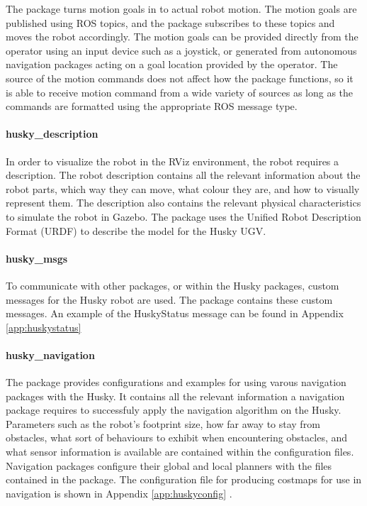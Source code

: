 The package  turns motion goals in to actual robot motion. The motion goals are published using ROS topics, and the  package subscribes to these topics and moves the robot accordingly. The motion goals can be provided directly from the operator using an input device such as a joystick, or generated from autonomous navigation packages acting on a goal location provided by the operator. The source of the motion commands does not affect how the package functions, so it is able to receive motion command from a wide variety of sources as long as the commands are formatted using the appropriate ROS message type.\\ 

\paragraph{husky\_description}

In order to visualize the robot in the RViz environment, the robot requires a description. The robot description contains all the relevant information about the robot parts, which way they can move, what colour they are, and how to visually represent them. The description also contains the relevant physical characteristics to simulate the robot in Gazebo. The  package uses the Unified Robot Description Format (URDF) to describe the model for the Husky UGV.\\

\paragraph{husky\_msgs}

To communicate with other packages, or within the Husky packages, custom messages for the Husky robot are used. The  package contains these custom messages. An example of the HuskyStatus message can be found in Appendix \ref{app:huskystatus}


\paragraph{husky\_navigation}

The  package provides configurations and examples for using varous navigation packages with the Husky. It contains all the relevant information a navigation package requires to successfuly apply the navigation algorithm on the Husky. Parameters such as the robot's footprint size, how far away to stay from obstacles, what sort of behaviours to exhibit when encountering obstacles, and what sensor information is available are contained within the configuration files. Navigation packages configure their global and local planners with the files contained in the  package. The configuration file for producing costmaps for use in navigation is shown in Appendix \ref{app:huskyconfig} .\\

